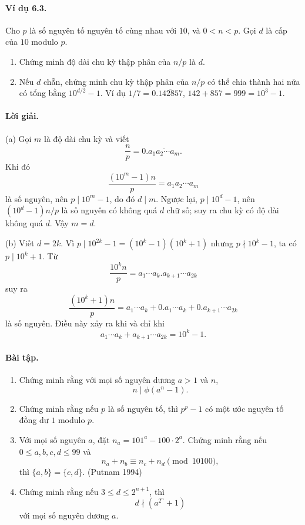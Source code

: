\documentclass[11pt]{article}
\begin{document}
\paragraph{Ví dụ 6.3.}
Cho \(p\) là số nguyên tố nguyên tố cùng nhau với \(10\), và \(0<n<p\). Gọi
\(d\) là cấp của \(10\) modulo \(p\).
\begin{enumerate}[label=(\alph*)]
\item Chứng minh độ dài chu kỳ thập phân của \(n/p\) là \(d\).
\item Nếu \(d\) chẵn, chứng minh chu kỳ thập phân của \(n/p\) có thể chia
thành hai nửa có tổng bằng \(10^{d/2}-1\). Ví dụ
\(1/7=0.\overline{142857}\), \(142+857=999=10^3-1\).
\end{enumerate}

\paragraph{Lời giải.}
(a) Gọi \(m\) là độ dài chu kỳ và viết
\[
 \frac np=0.\overline{a_1a_2\cdots a_m}.
\]
Khi đó
\[
 \frac{(10^m-1)n}{p}=a_1a_2\cdots a_m
\]
là số nguyên, nên \(p\mid10^m-1\), do đó \(d\mid m\). Ngược lại,
\(p\mid10^d-1\), nên \((10^d-1)n/p\) là số nguyên có không quá \(d\) chữ số;
suy ra chu kỳ có độ dài không quá \(d\). Vậy \(m=d\).

(b) Viết \(d=2k\). Vì \(p\mid10^{2k}-1=(10^k-1)(10^k+1)\) nhưng
\(p\nmid10^k-1\), ta có \(p\mid10^k+1\). Từ
\[
 \frac{10^kn}{p}=a_1\cdots a_k.a_{k+1}\cdots a_{2k}
\]
suy ra
\[
 \frac{(10^k+1)n}{p}
 =a_1\cdots a_k+0.a_1\cdots a_k+0.a_{k+1}\cdots a_{2k}
\]
là số nguyên. Điều này xảy ra khi và chỉ khi
\[
 a_1\cdots a_k+a_{k+1}\cdots a_{2k}=10^k-1.
\]

\paragraph{Bài tập.}
\begin{enumerate}
\item Chứng minh rằng với mọi số nguyên dương \(a>1\) và \(n\),
\[
 n\mid\phi(a^n-1).
\]
\item Chứng minh rằng nếu \(p\) là số nguyên tố, thì \(p^p-1\) có một ước
nguyên tố đồng dư \(1\) modulo \(p\).
\item Với mọi số nguyên \(a\), đặt \(n_a=101^a-100\cdot2^a\). Chứng minh rằng
nếu \(0\le a,b,c,d\le99\) và
\[
 n_a+n_b\equiv n_c+n_d\pmod{10100},
\]
thì \(\{a,b\}=\{c,d\}\). (Putnam 1994)
\item Chứng minh rằng nếu \(3\le d\le2^{n+1}\), thì
\[
 d\nmid(a^{2^n}+1)
\]
với mọi số nguyên dương \(a\).
\end{enumerate}
\end{document}
